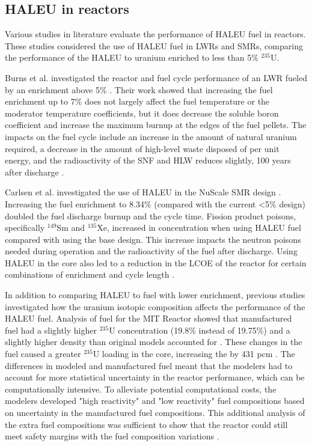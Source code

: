 \subsection{HALEU in reactors}
Various studies in literature evaluate the performance of 
\gls{HALEU} fuel in reactors. These studies considered the 
use of \gls{HALEU} fuel in \glspl{LWR} and \glspl{SMR}, 
comparing the performance of the \gls{HALEU} to uranium 
enriched to less than 5\% $^{235}$U. 

Burns et al. investigated the reactor and fuel cycle 
performance of an \gls{LWR} fueled by an enrichment above 5\% \cite{burns_reactor_2020}.
Their work showed that increasing the fuel enrichment up to 7\% does not 
largely affect the fuel temperature or the moderator temperature coefficients,
but it does decrease the soluble boron coefficient and increase the maximum 
burnup at the edges of the fuel pellets. The impacts on the fuel cycle include 
an increase in the amount of natural uranium required, a decrease in the 
amount of high-level waste disposed of per unit energy, and the 
radioactivity of the \gls{SNF} and \gls{HLW} reduces slightly, 100 years 
after discharge \cite{burns_reactor_2020}.

Carlsen et al. investigated the use of \gls{HALEU} in 
the NuScale \gls{SMR} design \cite{carlson_implications_2022}. 
Increasing the fuel 
enrichment to 8.34\% (compared with the current <5\% design) doubled 
the fuel discharge burnup and the cycle time. 
Fission product poisons, specifically $^{149}$Sm and $^{135}$Xe, increased 
in concentration when using \gls{HALEU} fuel compared with using the base 
design. This increase impacts the 
neutron poisons needed during operation and the radioactivity of 
the fuel after discharge. Using \gls{HALEU} in the core also led to a 
reduction in the \gls{LCOE} of the reactor for certain combinations of 
enrichment and cycle length \cite{carlson_economic_2020,carlson_implications_2022}.

In addition to comparing \gls{HALEU} to fuel with lower 
enrichment, previous studies investigated how the uranium 
isotopic composition affects the performance of the 
\gls{HALEU} fuel. Analysis of fuel for the \gls{MIT} 
Reactor showed that manufactured fuel had a slightly higher $^{235}$U 
concentration (19.8\% instead of 19.75\%) and a slightly higher 
density than original models accounted for \cite{mascolino_impact_2022}. 
These changes in the fuel caused a greater $^{235}$U loading in the core, 
increasing the \keff by 431 pcm \cite{mascolino_impact_2022}. The 
differences in modeled and manufactured fuel meant that the modelers 
had to account for more statistical uncertainty in the reactor performance, 
which can be computationally intensive. To alleviate potential 
computational costs, the modelers developed "high reactivity" and 
"low reactivity" fuel compositions based on uncertainty in the manufactured 
fuel compositions. This additional analysis of the extra fuel compositions 
was sufficient to show that the reactor could still meet safety margins 
with the fuel composition variations \cite{mascolino_impact_2022}.

